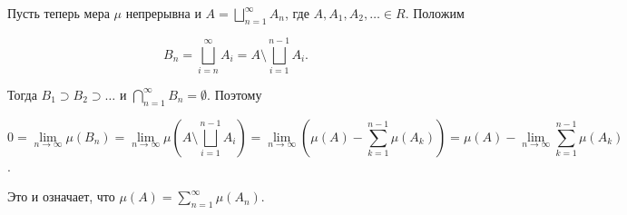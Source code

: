Пусть теперь мера $\mu$ непрерывна и $A = \bigsqcup \limits_{n = 1}^{\infty} A_n$, где $A, A_1, A_2, \ldots \in R$. Положим 

$$
    B_n = \bigsqcup_{i = n}^{\infty} A_i = 
    A \setminus \bigsqcup_{i = 1}^{n - 1} A_i.
$$

Тогда $B_1 \supset B_2 \supset \ldots$ и $\bigcap \limits_{n = 1}^{\infty} B_n = \emptyset$. Поэтому

$$
    0 = \lim_{n \to \infty} \mu(B_n) = 
    \lim_{n \to \infty} \mu \left( A \setminus \bigsqcup_{i = 1}^{n - 1} A_i \right) = 
    \lim_{n \to \infty} \left( \mu(A) - \sum_{k = 1}^{n - 1} \mu(A_k) \right) = 
    \mu(A) - \lim_{n \to \infty} \sum_{k = 1}^{n - 1} \mu(A_k)
$$.

Это и означает, что $\mu(A) = \sum \limits_{n = 1}^{\infty} \mu(A_n)$.
\EndProof